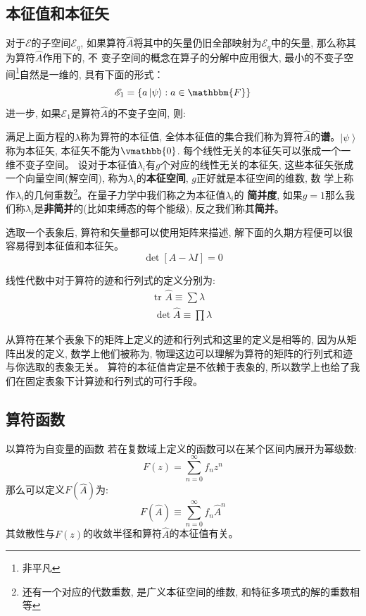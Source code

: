 \subsection*{本征值和本征矢}
对于$\mathscr{E}$的子空间$\mathscr{E}_q$, 如果算符$\hat{A}$将其中的矢量仍旧全部映射为$\mathscr{E}_q$中的矢量, 那么称其为算符$\hat{A}$作用下的, 不
变子空间的概念在算子的分解中应用很大, 最小的不变子空间\footnote[1]{非平凡}自然是一维的, 具有下面的形式：
\[\mathscr{E}_1=\left \{ a\left|\psi\right\rangle:a\in\mathbbm{F} \right \} \]
进一步, 如果$\mathscr{E}_1$是算符$\hat{A}$的不变子空间, 则:
\begin{lequation}
\end{lequation}
满足上面方程的$\lambda$称为算符的本征值, 全体本征值的集合我们称为算符$\hat{A}$的\textbf{谱}。$\left|\psi\right\rangle$称为本征矢, 本征矢不能为$\vmathbb{0}$. 每个线性无关的本征矢可以张成一个一维不变子空间。
设对于本征值$\lambda_i$有$g$个对应的线性无关的本征矢, 这些本征矢张成一个向量空间(解空间), 称为$\lambda_i$的\textbf{本征空间}, $g$正好就是本征空间的维数, 数
学上称作$\lambda_i$的几何重数\footnote[2]{还有一个对应的代数重数, 是广义本征空间的维数, 和特征多项式的解的重数相等}。在量子力学中我们称之为本征值$\lambda_i$的
\textbf{简并度}, 如果$g=1$那么我们称$\lambda_i$是\textbf{非简并}的(比如束缚态的每个能级), 反之我们称其\textbf{简并}。

选取一个表象后, 算符和矢量都可以使用矩阵来描述, 解下面的久期方程便可以很容易得到本征值和本征矢。
\begin{equation}
    \boxed{\det\left[A-\lambda I\right]=0}
\end{equation}

线性代数中对于算符的迹和行列式的定义分别为:
\[
\begin{array}{c}
    \text{tr } \hat{A} \equiv \sum \lambda \\
    \det \hat{A}\equiv \prod \lambda  
\end{array}\]

从算符在某个表象下的矩阵上定义的迹和行列式和这里的定义是相等的, 因为从矩阵出发的定义, 数学上他们被称为, 物理这边可以理解为算符的矩阵的行列式和迹与你选取的表象无关。
算符的本征值肯定是不依赖于表象的, 所以数学上也给了我们在固定表象下计算迹和行列式的可行手段。

\subsection*{算符函数}
\begin{define}{以算符为自变量的函数}
    若在复数域上定义的函数可以在某个区间内展开为幂级数:
    \begin{equation}
        F(z)=\sum_{n=0}^{\infty }f_nz^n
    \end{equation}
    那么可以定义$F\left(\hat{A}\right)$为:
    \begin{equation}
        F\left(\hat{A}\right)\equiv\sum_{n=0}^{\infty }f_n\hat{A}^n
    \end{equation}
    其敛散性与$F(z)$的收敛半径和算符$\hat{A}$的本征值有关。
\end{define}

